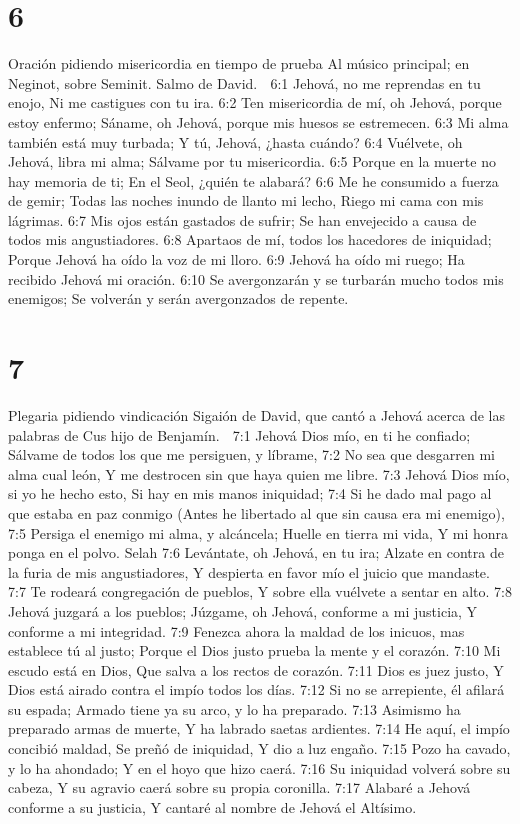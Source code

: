 \chapter{6}

Oración pidiendo misericordia en tiempo de prueba 
Al músico principal; en Neginot, sobre Seminit. Salmo de David. 

6:1 Jehová, no me reprendas en tu enojo, 
Ni me castigues con tu ira. 
6:2 Ten misericordia de mí, oh Jehová, porque estoy enfermo; 
Sáname, oh Jehová, porque mis huesos se estremecen. 
6:3 Mi alma también está muy turbada; 
Y tú, Jehová, ¿hasta cuándo? 
6:4 Vuélvete, oh Jehová, libra mi alma; 
Sálvame por tu misericordia. 
6:5 Porque en la muerte no hay memoria de ti; 
En el Seol, ¿quién te alabará? 
6:6 Me he consumido a fuerza de gemir; 
Todas las noches inundo de llanto mi lecho, 
Riego mi cama con mis lágrimas. 
6:7 Mis ojos están gastados de sufrir; 
Se han envejecido a causa de todos mis angustiadores. 
6:8 Apartaos de mí, todos los hacedores de iniquidad; 
Porque Jehová ha oído la voz de mi lloro. 
6:9 Jehová ha oído mi ruego; 
Ha recibido Jehová mi oración. 
6:10 Se avergonzarán y se turbarán mucho todos mis enemigos; 
Se volverán y serán avergonzados de repente. 

\chapter{7}

Plegaria pidiendo vindicación 
Sigaión de David, que cantó a Jehová acerca de las palabras de Cus hijo de Benjamín. 

7:1 Jehová Dios mío, en ti he confiado; 
Sálvame de todos los que me persiguen, y líbrame, 
7:2 No sea que desgarren mi alma cual león, 
Y me destrocen sin que haya quien me libre. 
7:3 Jehová Dios mío, si yo he hecho esto, 
Si hay en mis manos iniquidad; 
7:4 Si he dado mal pago al que estaba en paz conmigo 
(Antes he libertado al que sin causa era mi enemigo), 
7:5 Persiga el enemigo mi alma, y alcáncela; 
Huelle en tierra mi vida, 
Y mi honra ponga en el polvo. Selah 
7:6 Levántate, oh Jehová, en tu ira; 
Alzate en contra de la furia de mis angustiadores, 
Y despierta en favor mío el juicio que mandaste. 
7:7 Te rodeará congregación de pueblos, 
Y sobre ella vuélvete a sentar en alto. 
7:8 Jehová juzgará a los pueblos; 
Júzgame, oh Jehová, conforme a mi justicia, 
Y conforme a mi integridad. 
7:9 Fenezca ahora la maldad de los inicuos, mas establece tú al justo; 
Porque el Dios justo prueba la mente y el corazón. 
7:10 Mi escudo está en Dios, 
Que salva a los rectos de corazón. 
7:11 Dios es juez justo, 
Y Dios está airado contra el impío todos los días. 
7:12 Si no se arrepiente, él afilará su espada; 
Armado tiene ya su arco, y lo ha preparado. 
7:13 Asimismo ha preparado armas de muerte, 
Y ha labrado saetas ardientes. 
7:14 He aquí, el impío concibió maldad, 
Se preñó de iniquidad, 
Y dio a luz engaño. 
7:15 Pozo ha cavado, y lo ha ahondado; 
Y en el hoyo que hizo caerá. 
7:16 Su iniquidad volverá sobre su cabeza, 
Y su agravio caerá sobre su propia coronilla. 
7:17 Alabaré a Jehová conforme a su justicia, 
Y cantaré al nombre de Jehová el Altísimo. 

